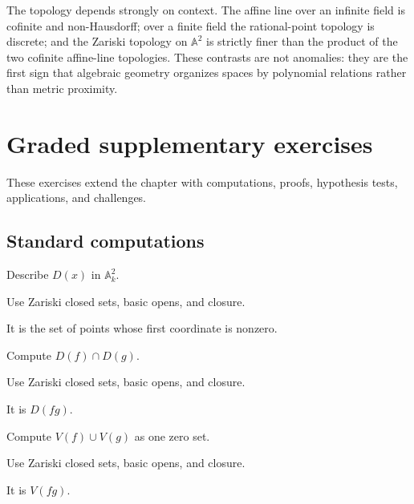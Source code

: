 The topology depends strongly on context.  The affine line over an infinite field is
cofinite and non-Hausdorff; over a finite field the rational-point topology is discrete;
and the Zariski topology on \(\mathbb A^2\) is strictly finer than the product of the two
cofinite affine-line topologies.  These contrasts are not anomalies: they are the first
sign that algebraic geometry organizes spaces by polynomial relations rather than metric
proximity.
\section{Graded supplementary exercises}
These exercises extend the chapter with computations, proofs, hypothesis tests, applications, and challenges.

\subsection*{Standard computations}

\begin{exercise}\label{exr:vi02-expand-01}
Describe $D(x)$ in $\mathbb A^2_k$.
\end{exercise}
\begin{hint}
Use Zariski closed sets, basic opens, and closure.
\end{hint}
\begin{solution}
It is the set of points whose first coordinate is nonzero.
\end{solution}

\begin{exercise}[Intersection]\label{exr:vi02-expand-02}
Compute $D(f)\cap D(g)$.
\end{exercise}
\begin{hint}
Use Zariski closed sets, basic opens, and closure.
\end{hint}
\begin{solution}
It is $D(fg)$.
\end{solution}

\begin{exercise}\label{exr:vi02-expand-03}
Compute $V(f)\cup V(g)$ as one zero set.
\end{exercise}
\begin{hint}
Use Zariski closed sets, basic opens, and closure.
\end{hint}
\begin{solution}
It is $V(fg)$.
\end{solution}

